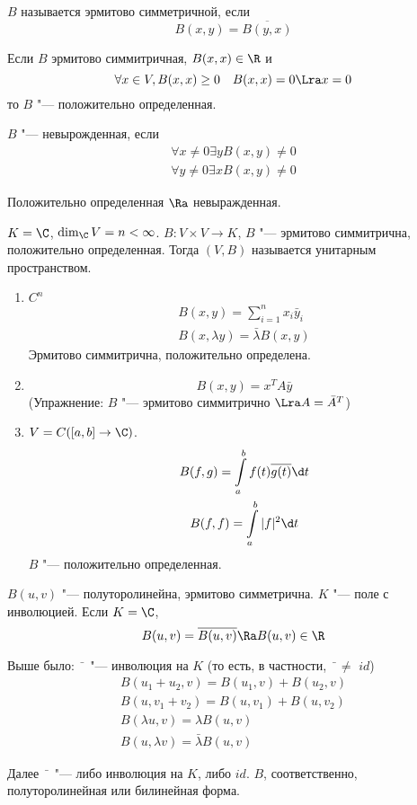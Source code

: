 \begin{Def}
	$B$ называется эрмитово симметричной, если
	\[ B(x, y) = \overline{B(y, x)} \]
\end{Def}

\begin{Def}
	Если $B$ эрмитово симмитричная, $B(x, x) \in \R$ и 
	\[ \forall x \in V, B(x, x) \ge 0 \quad B(x, x) = 0 \Lra x = 0 \]
	то $B$ "--- положительно определенная.
\end{Def}

\begin{Def}
	$B$ "--- невырожденная, если
	\begin{gather*}
		\forall x \ne 0 \exists y B(x, y) \ne 0 \\
		\forall y \ne 0 \exists x B(x, y) \ne 0
	\end{gather*}
\end{Def}
Положительно определенная $\Ra$ невыражденная.

\begin{Def}
	$K = \C$, $\dim_{\C}V = n < \infty$.
	$B \colon V \times V \to K$, $B$ "--- эрмитово симмитрична, положительно определенная.
	Тогда $(V, B)$ называется унитарным пространством.
\end{Def}

\begin{exmp}\hfill
	\begin{enumerate}
	\item
		$C^n$
		\begin{gather*}
			B(x, y) = \sum_{i=1}^n x_i\bar y_i \\
			B(x, \lambda y) = \bar\lambda B(x, y)
		\end{gather*}
		Эрмитово симмитрична, положительно определена.

	\item
		\[ B(x, y) = x^TA\bar y \]
		(Упражнение: $B$ "--- эрмитово  симмитрично $\Lra A  = \bar A^T$)
	
	\item
		$V = C([a, b] \to \C)$.
		\begin{gather*}
			B(f, g) = \int\limits_a^b f(t)\overline{g(t)}\d t \\
			B(f, f) = \int\limits_a^b |f|^2\d t
		\end{gather*}
		$B$ "--- положительно определенная.
	\end{enumerate}
\end{exmp}

$B(u, v)$ "--- полуторолинейна, эрмитово симметрична.
$K$ "--- поле с инволюцией.
Если $K = \C$,
\[ B(u, v) = \overline{B(u, v)} \Ra B(u, v) \in \R \]

Выше было: $\bar{\phantom{x}}$ "--- инволюция на $K$ (то есть, в частности, $\bar{\phantom{x}} \ne$ $id$)
\begin{gather*}
	B(u_1 + u_2, v) = B(u_1, v) + B(u_2, v) \\
	B(u, v_1 + v_2) = B(u, v_1) + B(u, v_2) \\
	B(\lambda u, v) = \lambda B(u, v) \\
	B(u, \lambda v) = \bar\lambda B(u, v)
\end{gather*}

Далее $\bar{\phantom{x}}$ "--- либо инволюция на $K$, либо $id$.
$B$, соответственно, полуторолинейная или билинейная форма.
